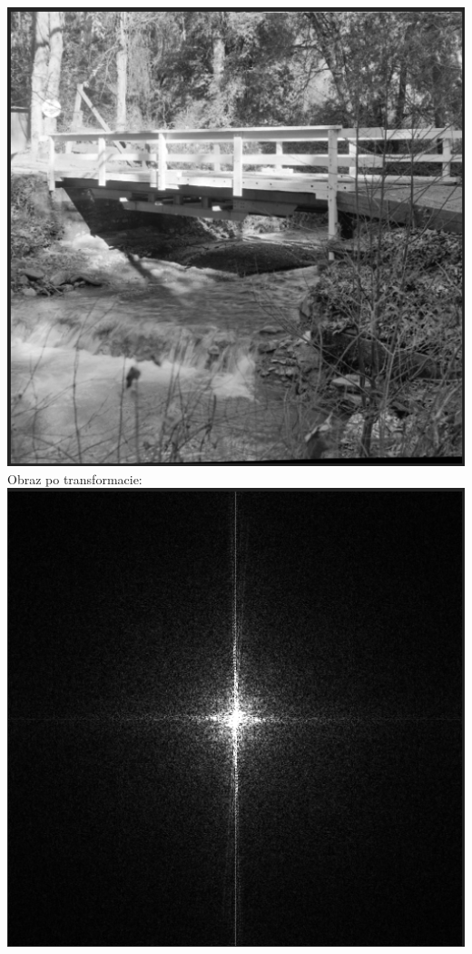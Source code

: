 \includegraphics[scale=0.4]{figures/bridge.png}\\

Obraz po transformacie:\\

\includegraphics[scale=0.4]{figures/bridge1.png}\\

